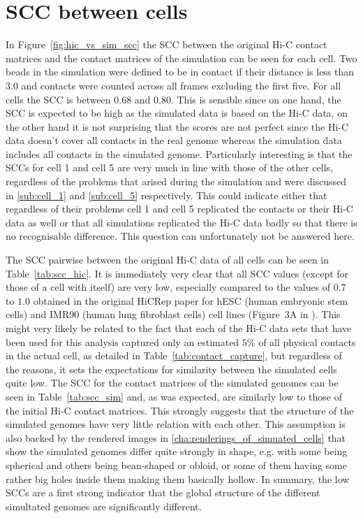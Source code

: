 \section{SCC between cells} %
\label{sec:scc_between_cells}

In Figure~\ref{fig:hic_vs_sim_scc} the SCC between the original Hi-C contact matrices and the contact matrices of the simulation can be seen for each cell. Two beads in the simulation were defined to be in contact if their distance is less than \(3.0\) and contacts were counted across all frames excluding the first five. For all cells the SCC is between 0.68 and 0.80. This is sensible since on one hand, the SCC is expected to be high as the simulated data is based on the Hi-C data, on the other hand it is not surprising that the scores are not perfect since the Hi-C data doesn’t cover all contacts in the real genome whereas the simulation data includes all contacts in the simulated genome. Particularly interesting is that the SCCs for cell 1 and cell 5 are very much in line with those of the other cells, regardless of the problems that arised during the simulation and were discussed in \ref{sub:cell_1} and \ref{sub:cell_5} respectively. This could indicate either that regardless of their problems cell 1 and cell 5 replicated the contacts or their Hi-C data as well or that all simulations replicated the Hi-C data badly so that there is no recognisable difference. This question can unfortunately not be answered here.

The SCC pairwise between the original Hi-C data of all cells can be seen in Table~\ref{tab:scc_hic}. It is immediately very clear that all SCC values (except for those of a cell with itself) are very low, especially compared to the values of \(0.7\) to \(1.0\) obtained in the original HiCRep paper for hESC (human embryonic stem cells) and IMR90 (human lung fibroblast cells) cell lines (Figure~3A in \cite{yang_hicrep_2017}). This might very likely be related to the fact that each of the Hi-C data sets that have been used for this analysis captured only an estimated \(5\%\) of all physical contacts in the actual cell, as detailed in Table~\ref{tab:contact_capture}, but regardless of the reasons, it sets the expectations for similarity between the simulated cells quite low. The SCC for the contact matrices of the simulated genomes can be seen in Table~\ref{tab:scc_sim} and, as was expected, are similarly low to those of the initial Hi-C contact matrices. This strongly suggests that the structure of the simulated genomes have very little relation with each other. This assumption is also backed by the rendered images in \ref{cha:renderings_of_simuated_cells} that show the simulated genomes differ quite strongly in shape, e.g. with some being spherical and others being bean-shaped or obloid, or some of them having some rather big holes inside them making them basically hollow. In summary, the low SCCs are a first strong indicator that the global structure of the different simultated genomes are significantly different.

